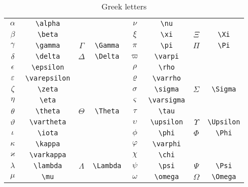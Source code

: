 \documentclass{article}
\begin{document}
\begin{table}
  \caption{Greek letters}
  \label{tab:greek-letters}
  \centering
  \begin{tabular}[c]{cccc@{\hskip 3em}cccc}
    \toprule
    $\alpha$ & \verb|\alpha| & & &
    $\nu$ & \verb|\nu| & & \\
    $\beta$ & \verb|\beta| & & &
    $\xi$ & \verb|\xi| & $\Xi$ & \verb|\Xi| \\
    $\gamma$ & \verb|\gamma| & $\Gamma$ & \verb|\Gamma| &
    $\pi$ & \verb|\pi| & $\Pi$ & \verb|\Pi| \\
    $\delta$ & \verb|\delta| & $\Delta$ & \verb|\Delta| &
    $\varpi$ & \verb|\varpi| & & \\
    $\epsilon$ & \verb|\epsilon| & & &
    $\rho$ & \verb|\rho| & & \\
    \addlinespace
    $\varepsilon$ & \verb|\varepsilon| & & &
    $\varrho$ & \verb|\varrho| & & \\
    $\zeta$ & \verb|\zeta| & & &
    $\sigma$ & \verb|\sigma| & $\Sigma$ & \verb|\Sigma| \\
    $\eta$ & \verb|\eta| & & &
    $\varsigma$ & \verb|\varsigma| & & \\
    $\theta$ & \verb|\theta| & $\Theta$ & \verb|\Theta| &
    $\tau$ & \verb|\tau| & & \\
    $\vartheta$ & \verb|\vartheta| & & &
    $\upsilon$ & \verb|\upsilon| & $\Upsilon$ & \verb|\Upsilon| \\
    \addlinespace
    $\iota$ & \verb|\iota| & & &
    $\phi$ & \verb|\phi| & $\Phi$ & \verb|\Phi| \\
    $\kappa$ & \verb|\kappa| & & &
    $\varphi$ & \verb|\varphi| & & \\
    $\varkappa$ & \verb|\varkappa| & & &
    $\chi$ & \verb|\chi| & & \\
    $\lambda$ & \verb|\lambda| & $\Lambda$ & \verb|\Lambda| &
    $\psi$ & \verb|\psi| & $\Psi$ & \verb|\Psi| \\
    $\mu$ & \verb|\mu| & & &
    $\omega$ & \verb|\omega| & $\Omega$ & \verb|\Omega| \\
    \bottomrule
  \end{tabular}
\end{table}
\end{document}
